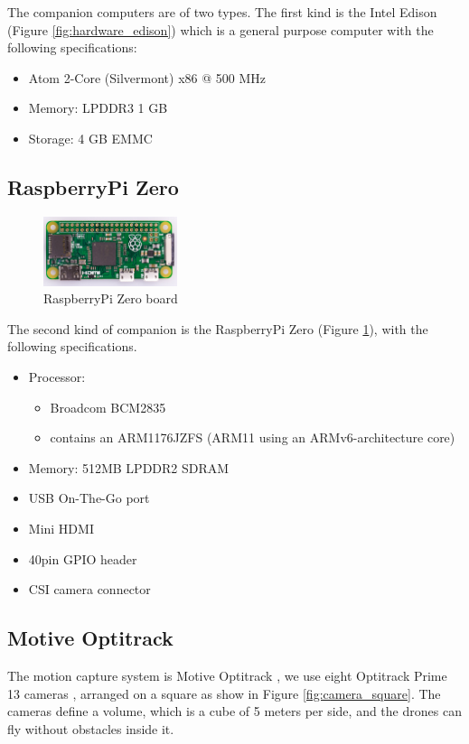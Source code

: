 The companion computers are of two types.
The first kind is the Intel Edison \cite{edison} (Figure \ref{fig:hardware_edison})
which is a general purpose computer with the following specifications:

\begin{itemize}
  \item Atom 2-Core (Silvermont) x86 @ 500 MHz
  \item Memory: LPDDR3 1 GB
  \item Storage: 4 GB EMMC
\end{itemize}

\subsection{RaspberryPi Zero}

\begin{figure}
\centering
\includegraphics[width=0.35\textwidth]{chapters/chapter-02/figures/hardware_raspberry.jpg}
\caption{RaspberryPi Zero board}
\label{fig:hardware_raspberry}
\end{figure}

The second kind of companion is the RaspberryPi Zero \cite{raspberry}
(Figure \ref{fig:hardware_raspberry}), with the following specifications.

\begin{itemize}
  \item Processor:
        \begin{itemize}
          \item Broadcom BCM2835
          \item contains an ARM1176JZFS (ARM11 using an ARMv6-architecture core)
        \end{itemize}

  \item Memory: 512MB LPDDR2 SDRAM
  \item USB On-The-Go port
  \item Mini HDMI
  \item 40pin GPIO header
  \item CSI camera connector
\end{itemize}

\subsection{Motive Optitrack}
The motion capture system is Motive Optitrack \cite{optitrack},
we use eight Optitrack Prime 13 cameras \cite{prime13},
arranged on a square as show in Figure \ref{fig:camera_square}.
The cameras define a volume, which is a cube of 5 meters per side,
and the drones can fly without obstacles inside it.

